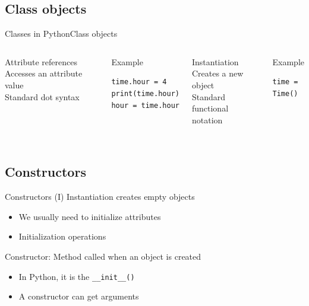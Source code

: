 \documentclass[10pt,compress]{beamer} %
\begin{document}
\subsection{Class objects}
\begin{frame}[fragile]{Classes in Python}{Class objects}
    \begin{columns}
	   		\begin{block}{Attribute references}
			Accesses an attribute value\\
			Standard dot syntax\\
			\bigskip
			\\
	   		\end{block}
	   		\begin{exampleblock}{Example}
\begin{verbatim}
time.hour = 4
print(time.hour)
hour = time.hour
\end{verbatim}
	   		\end{exampleblock}

	   		\begin{block}{Instantiation}
			Creates a new object\\
			Standard functional notation\\
			\bigskip
			\\
	   		\end{block}
	   		\begin{exampleblock}{Example}
\begin{verbatim}
time = Time()
\end{verbatim}
	   		\end{exampleblock}
	\end{columns}
\end{frame}

\subsection{Constructors}
\begin{frame}{Constructors (I)}
		Instantiation creates empty objects
		\begin{itemize}
			\item We usually need to initialize attributes
			\item Initialization operations
		\end{itemize}
		\alert{Constructor}: Method called when an object is created
		\begin{itemize}
			\item In Python, it is the \texttt{\_\_init\_\_()}
			\item A constructor can get arguments
		\end{itemize}
\end{frame}
\end{document}
